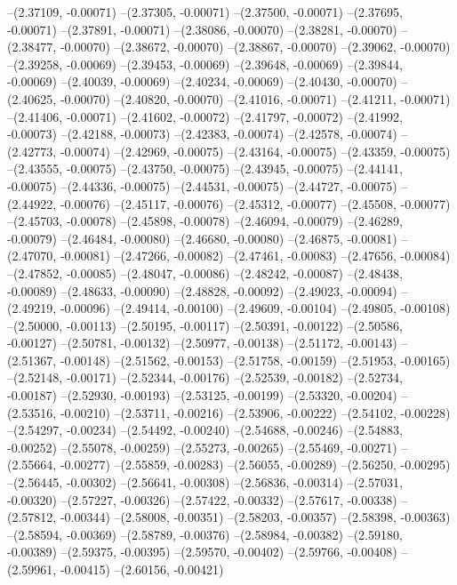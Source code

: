 --(2.37109, -0.00071)
--(2.37305, -0.00071)
--(2.37500, -0.00071)
--(2.37695, -0.00071)
--(2.37891, -0.00071)
--(2.38086, -0.00070)
--(2.38281, -0.00070)
--(2.38477, -0.00070)
--(2.38672, -0.00070)
--(2.38867, -0.00070)
--(2.39062, -0.00070)
--(2.39258, -0.00069)
--(2.39453, -0.00069)
--(2.39648, -0.00069)
--(2.39844, -0.00069)
--(2.40039, -0.00069)
--(2.40234, -0.00069)
--(2.40430, -0.00070)
--(2.40625, -0.00070)
--(2.40820, -0.00070)
--(2.41016, -0.00071)
--(2.41211, -0.00071)
--(2.41406, -0.00071)
--(2.41602, -0.00072)
--(2.41797, -0.00072)
--(2.41992, -0.00073)
--(2.42188, -0.00073)
--(2.42383, -0.00074)
--(2.42578, -0.00074)
--(2.42773, -0.00074)
--(2.42969, -0.00075)
--(2.43164, -0.00075)
--(2.43359, -0.00075)
--(2.43555, -0.00075)
--(2.43750, -0.00075)
--(2.43945, -0.00075)
--(2.44141, -0.00075)
--(2.44336, -0.00075)
--(2.44531, -0.00075)
--(2.44727, -0.00075)
--(2.44922, -0.00076)
--(2.45117, -0.00076)
--(2.45312, -0.00077)
--(2.45508, -0.00077)
--(2.45703, -0.00078)
--(2.45898, -0.00078)
--(2.46094, -0.00079)
--(2.46289, -0.00079)
--(2.46484, -0.00080)
--(2.46680, -0.00080)
--(2.46875, -0.00081)
--(2.47070, -0.00081)
--(2.47266, -0.00082)
--(2.47461, -0.00083)
--(2.47656, -0.00084)
--(2.47852, -0.00085)
--(2.48047, -0.00086)
--(2.48242, -0.00087)
--(2.48438, -0.00089)
--(2.48633, -0.00090)
--(2.48828, -0.00092)
--(2.49023, -0.00094)
--(2.49219, -0.00096)
--(2.49414, -0.00100)
--(2.49609, -0.00104)
--(2.49805, -0.00108)
--(2.50000, -0.00113)
--(2.50195, -0.00117)
--(2.50391, -0.00122)
--(2.50586, -0.00127)
--(2.50781, -0.00132)
--(2.50977, -0.00138)
--(2.51172, -0.00143)
--(2.51367, -0.00148)
--(2.51562, -0.00153)
--(2.51758, -0.00159)
--(2.51953, -0.00165)
--(2.52148, -0.00171)
--(2.52344, -0.00176)
--(2.52539, -0.00182)
--(2.52734, -0.00187)
--(2.52930, -0.00193)
--(2.53125, -0.00199)
--(2.53320, -0.00204)
--(2.53516, -0.00210)
--(2.53711, -0.00216)
--(2.53906, -0.00222)
--(2.54102, -0.00228)
--(2.54297, -0.00234)
--(2.54492, -0.00240)
--(2.54688, -0.00246)
--(2.54883, -0.00252)
--(2.55078, -0.00259)
--(2.55273, -0.00265)
--(2.55469, -0.00271)
--(2.55664, -0.00277)
--(2.55859, -0.00283)
--(2.56055, -0.00289)
--(2.56250, -0.00295)
--(2.56445, -0.00302)
--(2.56641, -0.00308)
--(2.56836, -0.00314)
--(2.57031, -0.00320)
--(2.57227, -0.00326)
--(2.57422, -0.00332)
--(2.57617, -0.00338)
--(2.57812, -0.00344)
--(2.58008, -0.00351)
--(2.58203, -0.00357)
--(2.58398, -0.00363)
--(2.58594, -0.00369)
--(2.58789, -0.00376)
--(2.58984, -0.00382)
--(2.59180, -0.00389)
--(2.59375, -0.00395)
--(2.59570, -0.00402)
--(2.59766, -0.00408)
--(2.59961, -0.00415)
--(2.60156, -0.00421)
